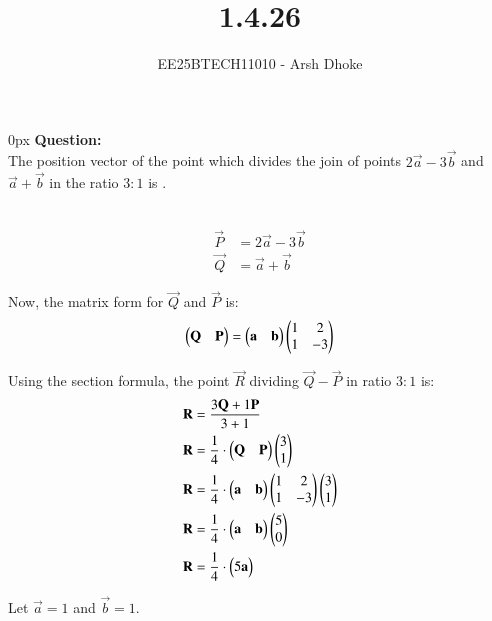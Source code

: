\documentclass[journal]{IEEEtran}
\begin{document}

\vspace{3cm}

\title{1.4.26}
\author{EE25BTECH11010 - Arsh Dhoke}
{\let\newpage\relax\maketitle}

\renewcommand{\thefigure}{\theenumi}
\renewcommand{\thetable}{\theenumi}
\setlength{\intextsep}{10pt}
\renewcommand{\thetable}{\theenumi}

\parindent 0px
\textbf{Question:} \\
The position vector of the point which divides the join of points $2\vec{a} - 3\vec{b}$ and $\vec{a} + \vec{b}$ in the ratio $3:1$ is \underline{\hspace{2cm}}.

\solution \\

\begin{align}
    \vec{P} &= 2\vec{a}-3\vec{b}\\
    \vec{Q} &= \vec{a}+\vec{b}
\end{align}

Now, the matrix form for $\vec{Q}$ and $\vec{P}$ is:
\begin{align}
\begin{pmatrix}\mathbf{Q} & \mathbf{P}\end{pmatrix}
=\begin{pmatrix}\mathbf{a} & \mathbf{b}\end{pmatrix}
\begin{pmatrix}1 & 2 \\ 1 & -3\end{pmatrix}
\end{align}

Using the section formula, the point $\vec{R}$ dividing $\vec{Q} - \vec{P}$ in ratio $3:1$ is:
\begin{align}
\mathbf{R} &= \frac{3\mathbf{Q} + 1\mathbf{P}}{3+1} \\
\mathbf{R} &= \frac{1}{4} \cdot \begin{pmatrix}\mathbf{Q} & \mathbf{P}\end{pmatrix} \begin{pmatrix}3 \\ 1\end{pmatrix} \\
\mathbf{R} &= \frac{1}{4} \cdot \begin{pmatrix}\mathbf{a} & \mathbf{b}\end{pmatrix}\begin{pmatrix}1 & 2 \\ 1 & -3\end{pmatrix} \begin{pmatrix}3 \\ 1\end{pmatrix} \\
\mathbf{R} &= \frac{1}{4} \cdot \begin{pmatrix}\mathbf{a} & \mathbf{b}\end{pmatrix} \begin{pmatrix}5 \\ 0\end{pmatrix} \\
\mathbf{R} &= \frac{1}{4} \cdot \begin{pmatrix}5\mathbf{a}\end{pmatrix}  
\end{align}


Let $\vec{a}=1$ and $\vec{b}=1$.
\end{document}
